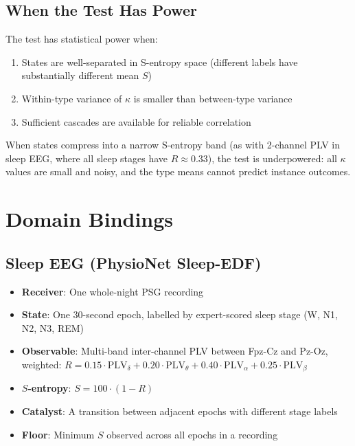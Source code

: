 \documentclass[11pt,a4paper]{article}
\theoremstyle{definition}
\theoremstyle{remark}
\newcommand{\Rorder}{R}
\begin{document}
\subsection{When the Test Has Power}

The test has statistical power when:
\begin{enumerate}[nosep]
\item States are well-separated in S-entropy space (different labels have substantially different mean $S$)
\item Within-type variance of $\kappa$ is smaller than between-type variance
\item Sufficient cascades are available for reliable correlation
\end{enumerate}

When states compress into a narrow S-entropy band (as with 2-channel PLV in sleep EEG, where all sleep stages have $\Rorder \approx 0.33$), the test is underpowered: all $\kappa$ values are small and noisy, and the type means cannot predict instance outcomes.

\section{Domain Bindings}
\label{sec:domains}

\subsection{Sleep EEG (PhysioNet Sleep-EDF)}

\begin{itemize}[nosep]
\item \textbf{Receiver}: One whole-night PSG recording
\item \textbf{State}: One 30-second epoch, labelled by expert-scored sleep stage (W, N1, N2, N3, REM)
\item \textbf{Observable}: Multi-band inter-channel PLV between Fpz-Cz and Pz-Oz, weighted: $\Rorder = 0.15\cdot\mathrm{PLV}_\delta + 0.20\cdot\mathrm{PLV}_\theta + 0.40\cdot\mathrm{PLV}_\alpha + 0.25\cdot\mathrm{PLV}_\beta$
\item \textbf{$S$-entropy}: $S = 100 \cdot (1 - \Rorder)$
\item \textbf{Catalyst}: A transition between adjacent epochs with different stage labels
\item \textbf{Floor}: Minimum $S$ observed across all epochs in a recording
\end{itemize}
\end{document}
